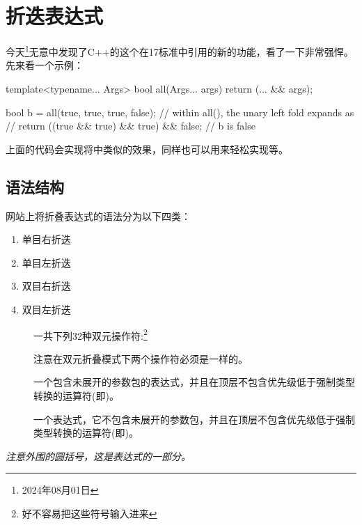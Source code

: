 \chapter{折迭表达式}
今天\footnote{2024年08月01日}无意中发现了C++的这个在17标准中引用的新的功能，看了一下非常强悍。先来看一个示例：
\begin{cpplst}
template<typename... Args>
bool all(Args... args) { return (... && args); }

bool b = all(true, true, true, false);
// within all(), the unary left fold expands as
//  return ((true && true) && true) && false;
// b is false
\end{cpplst}
上面的代码会实现将中类似的效果，同样也可以用来轻松实现等。

\section{语法结构}
网站上将折叠表达式的语法分为以下四类：
\begin{enumerate}
	\item {} 单目右折迭
	\item {} 单目左折迭
	\item {} 双目右折迭
	\item {} 双目左折迭
\end{enumerate}

\begin{description}
	\item[] 一共下列32种双元操作符:\footnote{好不容易把这些符号输入进来}



	      注意在双元折叠模式下两个操作符必须是一样的。
	\item[] 一个包含未展开的参数包的表达式，并且在顶层不包含优先级低于强制类型转换的运算符(即)。
	\item[]
	      一个表达式，它不包含未展开的参数包，并且在顶层不包含优先级低于强制类型转换的运算符(即)。
\end{description}
\emph{注意外围的圆括号，这是表达式的一部分。}

